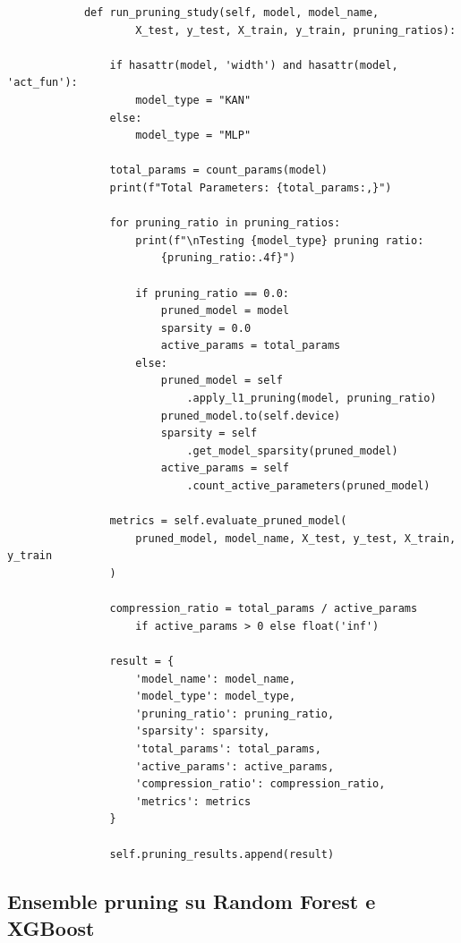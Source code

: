 \documentclass[a4paper,12pt]{report}
\begin{document}
\begin{verbatim}
			def run_pruning_study(self, model, model_name, 
					X_test, y_test, X_train, y_train, pruning_ratios):
				
				if hasattr(model, 'width') and hasattr(model, 'act_fun'):
					model_type = "KAN"
				else:
					model_type = "MLP"
				
				total_params = count_params(model)
				print(f"Total Parameters: {total_params:,}")
				
				for pruning_ratio in pruning_ratios:
					print(f"\nTesting {model_type} pruning ratio: 
						{pruning_ratio:.4f}")
				
					if pruning_ratio == 0.0:
						pruned_model = model
						sparsity = 0.0
						active_params = total_params
					else:
						pruned_model = self
							.apply_l1_pruning(model, pruning_ratio)
						pruned_model.to(self.device)
						sparsity = self
							.get_model_sparsity(pruned_model)
						active_params = self
							.count_active_parameters(pruned_model)
				
				metrics = self.evaluate_pruned_model(
					pruned_model, model_name, X_test, y_test, X_train, y_train
				)
				
				compression_ratio = total_params / active_params 
					if active_params > 0 else float('inf')
				
				result = {
					'model_name': model_name,
					'model_type': model_type,
					'pruning_ratio': pruning_ratio,
					'sparsity': sparsity,
					'total_params': total_params,
					'active_params': active_params,
					'compression_ratio': compression_ratio,
					'metrics': metrics
				}
				
				self.pruning_results.append(result)
	\end{verbatim}
	
	\subsection{Ensemble pruning su Random Forest e XGBoost}
	
\end{document}
